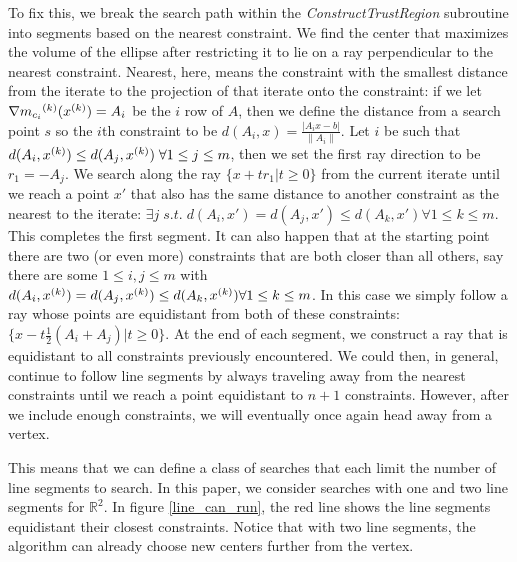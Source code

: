 To fix this, we break the search path within the \emph{ConstructTrustRegion} subroutine into segments based on the nearest constraint.
We find the center that maximizes the volume of the ellipse after restricting it to lie on a ray perpendicular to the nearest constraint.
Nearest, here, means the constraint with the smallest distance from the iterate to the projection of that iterate onto the constraint:
if we let $\nabla {{m}_{c_i}}^{(k)}({x}^{(k)}) = A_i$ be the $i$ row of $A$, then we define the distance from a search point $s$ so the $i$th constraint to be
$d(A_i, x) = \frac {|A_i x - b|}{\|A_i\|}$.
Let $i$ be such that $d(A_i, {x}^{(k)}) \le d(A_j, {x}^{(k)}) \; \forall 1\le j\le m$, then we set the first ray direction to be $r_1=-A_j$.
We search along the ray $\{x +tr_1|t\ge 0\}$ from the current iterate until we reach a point $x'$ that also has the same distance to another constraint as the nearest to the iterate:
$\exists j \;s.t.\; d(A_i, x') = d(A_j, x') \le d(A_k, x') \forall 1\le k \le m$.
This completes the first segment.
It can also happen that at the starting point there are two (or even more) constraints that are both closer than all others, say there are some $1\le i,j\le m$ with $d(A_i, {x}^{(k)}) = d(A_j, {x}^{(k)}) \le d(A_k, {x}^{(k)})  \forall 1\le k \le m$.
In this case we simply follow a ray whose points are equidistant from both of these constraints: $\{x - t\frac 1 2 (A_i + A_j)| t \ge 0\}$.
At the end of each segment, we construct a ray that is equidistant to all constraints previously encountered.
We could then, in general, continue to follow line segments by always traveling away from the nearest constraints until we reach a point equidistant to $n+1$ constraints.
However, after we include enough constraints, we will eventually once again head away from a vertex.

This means that we can define a class of searches that each limit the number of line segments to search.
In this paper, we consider searches with one and two line segments for $\mathbb R^2$.
In figure \cref{line_can_run}, the red line shows the line segments equidistant their closest constraints.
Notice that with two line segments, the algorithm can already choose new centers further from the vertex.

